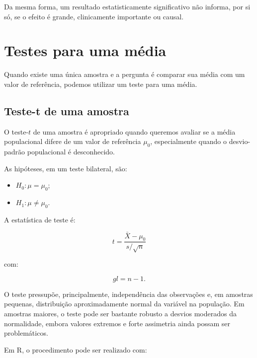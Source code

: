 Da mesma forma, um resultado estatisticamente significativo não informa, por
si só, se o efeito é grande, clinicamente importante ou causal.

\section{Testes para uma média}

Quando existe uma única amostra e a pergunta é comparar sua média com um valor
de referência, podemos utilizar um teste para uma média.

\subsection{Teste-t de uma amostra}

O teste-$t$ de uma amostra é apropriado quando queremos avaliar se a média
populacional difere de um valor de referência $\mu_0$, especialmente quando
o desvio-padrão populacional é desconhecido.

As hipóteses, em um teste bilateral, são:

\begin{itemize}
    \item $H_0:\mu=\mu_0$;
    \item $H_1:\mu\neq\mu_0$.
\end{itemize}

A estatística de teste é:

\begin{equation}
  t= \frac{\bar X-\mu_0}{s/\sqrt{n}}
\end{equation}

com:

\begin{equation}
  gl=n-1.
\end{equation}

O teste pressupõe, principalmente, independência das observações e, em
amostras pequenas, distribuição aproximadamente normal da variável na
população. Em amostras maiores, o teste pode ser bastante robusto a desvios
moderados da normalidade, embora valores extremos e forte assimetria ainda
possam ser problemáticos.

Em R, o procedimento pode ser realizado com:


